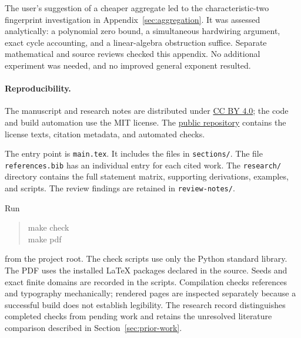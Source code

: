 The user's suggestion of a cheaper aggregate led to the
characteristic-two fingerprint investigation in
Appendix~\ref{sec:aggregation}. It was assessed analytically: a
polynomial zero bound, a simultaneous hardwiring argument, exact
cycle accounting, and a linear-algebra obstruction suffice. Separate
mathematical and source reviews checked this appendix. No additional
experiment was needed, and no improved general exponent resulted.

\paragraph{Reproducibility.}
The manuscript and research notes are distributed under
\href{https://creativecommons.org/licenses/by/4.0/}{CC BY 4.0};
the code and build automation use the MIT license. The
\href{https://github.com/SamuelSchlesinger/understanding-nondeterminism}{public repository}
contains the license texts, citation metadata, and automated checks.

The entry point is \texttt{main.tex}. It includes the files in
\texttt{sections/}. The file \texttt{references.bib} has an individual entry
for each cited work. The \texttt{research/} directory contains the
full statement matrix, supporting derivations, examples, and scripts.
The review findings are retained in \texttt{review-notes/}.
\begin{samepage}
Run
\begin{quote}\ttfamily
make check\\
make pdf
\end{quote}
\end{samepage}
from the project root. The check scripts use only the Python standard
library. The PDF uses the installed \LaTeX{} packages declared in
the source. Seeds and exact finite domains are recorded in the scripts.
Compilation checks references and typography mechanically; rendered
pages are inspected separately because a successful build does not
establish legibility. The research record distinguishes completed
checks from pending work and retains the unresolved literature
comparison described in Section~\ref{sec:prior-work}.
